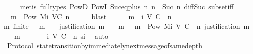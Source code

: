\begin{isabellebody}
\ \ \ \ \isamarkupfalse%
\ {\isacharparenleft}metis\ {\isacharparenleft}full{\isacharunderscore}types{\isacharparenright}\ PowD\ PowI\ Suc{\isacharunderscore}eq{\isacharunderscore}plus{}\ {\isacartoucheopen}{\isasymexists}n{\isacharprime}{\isachardot}\ n\ {\isacharequal}\ Suc\ n{\isacharprime}{\isacartoucheclose}\ diff{\isacharunderscore}Suc{\isacharunderscore}{}\ subset{\isacharunderscore}iff{\isacharparenright}\isanewline
\ \ \isamarkupfalse%
\ \isamarkupfalse%
\ {\isachardoublequoteopen}{\isasymsigma}\ {\isasymunion}\ {\isacharbraceleft}m{\isacharbraceright}\ {\isasymin}\ Pow\ {\isacharparenleft}M{\isacharunderscore}i\ {\isacharparenleft}V{\isacharcomma}C{\isacharcomma}{\isasymepsilon}{\isacharparenright}\ n{\isacharparenright}{\isachardoublequoteclose}\isanewline
\ \ \ \ \isamarkupfalse%
\ blast\isanewline
\isanewline
\ \ \isamarkupfalse%
\ {\isachardoublequoteopen}{\isasymsigma}\ {\isasymunion}\ {\isacharbraceleft}m{\isacharbraceright}\ {\isasymin}\ {\isasymSigma}{\isacharunderscore}i\ {\isacharparenleft}V{\isacharcomma}\ C{\isacharcomma}\ {\isasymepsilon}{\isacharparenright}\ {\isacharparenleft}n\ {\isacharplus}\ {}{\isacharparenright}{\isachardoublequoteclose}\isanewline
\ \ \ \ \isamarkupfalse%
\ {\isacartoucheopen}{\isasymAnd}m{\isacharprime}{\isachardot}\ finite\ {\isasymsigma}\ {\isasymand}\ m{\isacharprime}\ {\isasymin}\ {\isasymsigma}\ {\isasymLongrightarrow}\ justification\ m{\isacharprime}\ {\isasymsubseteq}\ {\isasymsigma}\ {\isasymunion}\ {\isacharbraceleft}m{\isacharbraceright}{\isacartoucheclose}\ {\isacartoucheopen}{\isasymsigma}\ {\isasymunion}\ {\isacharbraceleft}m{\isacharbraceright}\ {\isasymin}\ Pow\ {\isacharparenleft}M{\isacharunderscore}i\ {\isacharparenleft}V{\isacharcomma}\ C{\isacharcomma}\ {\isasymepsilon}{\isacharparenright}\ n{\isacharparenright}{\isacartoucheclose}\ {\isacartoucheopen}justification\ m\ {\isasymsubseteq}\ {\isasymsigma}\ {\isasymunion}\ {\isacharbraceleft}m{\isacharbraceright}{\isacartoucheclose}\ \isanewline
\ \ \ \ {\isacartoucheopen}{\isasymsigma}\ {\isasymin}\ {\isasymSigma}{\isacharunderscore}i\ {\isacharparenleft}V{\isacharcomma}\ C{\isacharcomma}\ {\isasymepsilon}{\isacharparenright}\ n{\isacartoucheclose}\ si\ \isamarkupfalse%
\ auto\isanewline
{}\isamarkupfalse%
%
\endisatagproof
{\isafoldproof}%
%
\isadelimproof
\isanewline
%
\endisadelimproof
\isanewline
{}\isamarkupfalse%
\ {\isacharparenleft}\ Protocol{\isacharparenright}\ state{\isacharunderscore}transition{\isacharunderscore}by{\isacharunderscore}immediately{\isacharunderscore}next{\isacharunderscore}message{\isacharunderscore}of{\isacharunderscore}same{\isacharunderscore}depth{\isacharcolon}\ \isanewline

\end{isabellebody}
